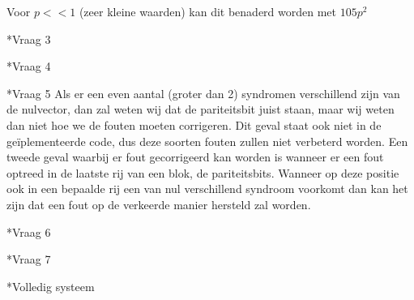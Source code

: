 \documentclass[]{article}
\begin{document}
\begin{section}
\begin{subsection}
    	Voor $p << 1$ (zeer kleine waarden) kan dit benaderd worden met $105p^2$
    \end{subsection}

    \begin{subsection}*{Vraag 3} %
    \end{subsection}

    \begin{subsection}*{Vraag 4} %
    \end{subsection}

    \begin{subsection}*{Vraag 5} %
    	Als er een even aantal (groter dan 2) syndromen verschillend zijn van de nulvector,
    	dan zal weten wij dat de pariteitsbit juist staan, maar wij weten dan niet hoe we
    	de fouten moeten corrigeren. Dit geval staat ook niet in de ge\"iplementeerde code,
    	dus deze soorten fouten zullen niet verbeterd worden.
    	Een tweede geval waarbij er fout gecorrigeerd kan worden is wanneer er een fout
    	optreed in de laatste rij van een blok, de pariteitsbits. Wanneer op deze positie
    	ook in een bepaalde rij een van nul verschillend syndroom voorkomt dan kan het zijn
    	dat een fout op de verkeerde manier hersteld zal worden.
    \end{subsection}

    \begin{subsection}*{Vraag 6} %
    \end{subsection}

    \begin{subsection}*{Vraag 7} %
    \end{subsection}

\end{section}

\begin{section}*{Volledig systeem} %
\end{section}
\end{document}

